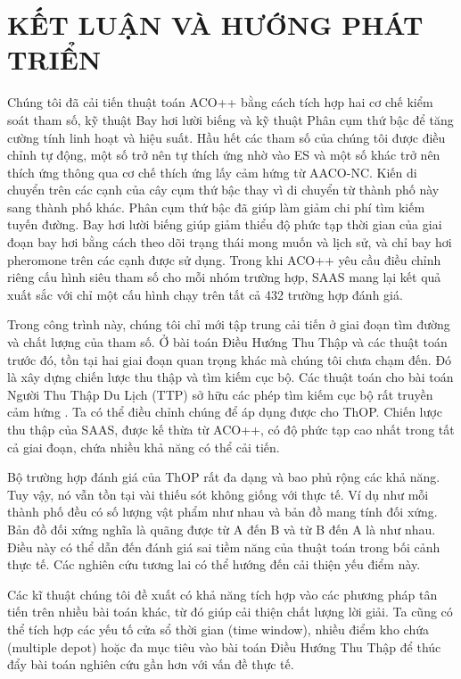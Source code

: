 \chapter{KẾT LUẬN VÀ HƯỚNG PHÁT TRIỂN} \label{chapter:Conclusion}

Chúng tôi đã cải tiến thuật toán ACO++ bằng cách tích hợp hai cơ chế kiểm soát tham số, kỹ thuật Bay hơi lười biếng và kỹ thuật Phân cụm thứ bậc để tăng cường tính linh hoạt và hiệu suất. Hầu hết các tham số của chúng tôi được điều chỉnh tự động, một số trở nên tự thích ứng nhờ vào ES và một số khác trở nên thích ứng thông qua cơ chế thích ứng lấy cảm hứng từ AACO-NC. Kiến di chuyển trên các cạnh của cây cụm thứ bậc thay vì di chuyển từ thành phố này sang thành phố khác. Phân cụm thứ bậc đã giúp làm giảm chi phí tìm kiếm tuyến đường. Bay hơi lười biếng giúp giảm thiểu độ phức tạp thời gian của giai đoạn bay hơi bằng cách theo dõi trạng thái mong muốn và lịch sử, và chỉ bay hơi pheromone trên các cạnh được sử dụng. Trong khi ACO++ yêu cầu điều chỉnh riêng cấu hình siêu tham số cho mỗi nhóm trường hợp, SAAS mang lại kết quả xuất sắc với chỉ một cấu hình chạy trên tất cả 432 trường hợp đánh giá.

Trong công trình này, chúng tôi chỉ mới tập trung cải tiến ở giai đoạn tìm đường và chất lượng của tham số. Ở bài toán Điều Hướng Thu Thập và các thuật toán trước đó, tồn tại hai giai đoạn quan trọng khác mà chúng tôi chưa chạm đến. Đó là xây dựng chiến lược thu thập và tìm kiếm cục bộ. Các thuật toán cho bài toán Người Thu Thập Du Lịch (TTP) sở hữu các phép tìm kiếm cục bộ rất truyền cảm hứng \cite{Namazi2023SolvingTT}. Ta có thể điều chỉnh chúng để áp dụng được cho ThOP. Chiến lược thu thập của SAAS, được kế thừa từ ACO++, có độ phức tạp cao nhất trong tất cả giai đoạn, chứa nhiều khả năng có thể cải tiến.

Bộ trường hợp đánh giá của ThOP rất đa dạng và bao phủ rộng các khả năng. Tuy vậy, nó vẫn tồn tại vài thiếu sót không giống với thực tế. Ví dụ như mỗi thành phố đều có số lượng vật phẩm như nhau và bản đồ mang tính đối xứng. Bản đồ đối xứng nghĩa là quãng được từ A đến B và từ B đến A là như nhau. Điều này có thể dẫn đến đánh giá sai tiềm năng của thuật toán trong bối cảnh thực tế. Các nghiên cứu tương lai có thể hướng đến cải thiện yếu điểm này.

Các kĩ thuật chúng tôi đề xuất có khả năng tích hợp vào các phương pháp tân tiến trên nhiều bài toán khác, từ đó giúp cải thiện chất lượng lời giải. Ta cũng có thể tích hợp các yếu tố cửa sổ thời gian (time window), nhiều điểm kho chứa (multiple depot) hoặc đa mục tiêu vào bài toán Điều Hướng Thu Thập để thúc đẩy bài toán nghiên cứu gần hơn với vấn đề thực tế. 
